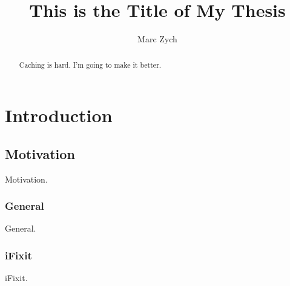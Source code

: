 \documentclass[12pt]{ucthesis}
\begin{document}

\title{This is the Title of My Thesis}
\author{Marc Zych}
  
 
     



\maketitle

\begin{frontmatter}

\copyrightpage

\committeemembershippage

\begin{abstract}

Caching is hard. I'm going to make it better.

\end{abstract}


\tableofcontents


\listoftables

\listoffigures

\end{frontmatter}

\pagestyle{plain}




\renewcommand{\baselinestretch}{1.66}


\chapter{Introduction}
\label{introduction}

\section{Motivation}
Motivation.

\subsection{General}
General.

\subsection{iFixit}
iFixit.
\end{document}
